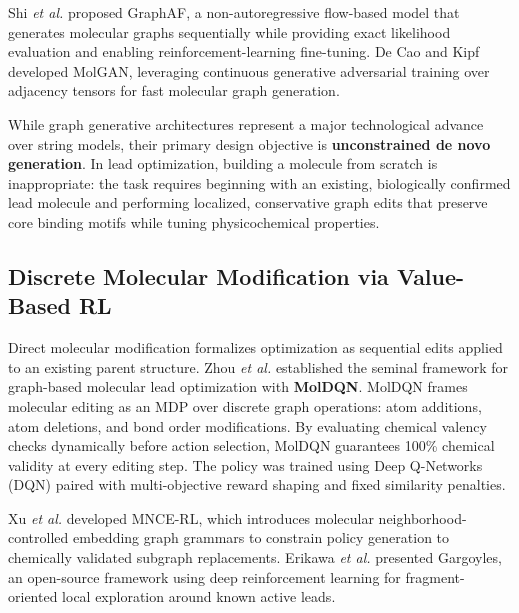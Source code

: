 \documentclass{ieeeaccess}
\begin{document}
Shi \emph{et al.} \cite{shi2020} proposed GraphAF, a non-autoregressive flow-based model that generates molecular graphs sequentially while providing exact likelihood evaluation and enabling reinforcement-learning fine-tuning. De Cao and Kipf \cite{decao2018} developed MolGAN, leveraging continuous generative adversarial training over adjacency tensors for fast molecular graph generation.

While graph generative architectures represent a major technological advance over string models, their primary design objective is \textbf{unconstrained de novo generation}. In lead optimization, building a molecule from scratch is inappropriate: the task requires beginning with an existing, biologically confirmed lead molecule and performing localized, conservative graph edits that preserve core binding motifs while tuning physicochemical properties.

\subsection{Discrete Molecular Modification via Value-Based RL}
Direct molecular modification formalizes optimization as sequential edits applied to an existing parent structure. Zhou \emph{et al.} \cite{zhou2019} established the seminal framework for graph-based molecular lead optimization with \textbf{MolDQN}. MolDQN frames molecular editing as an MDP over discrete graph operations: atom additions, atom deletions, and bond order modifications. By evaluating chemical valency checks dynamically before action selection, MolDQN guarantees 100\% chemical validity at every editing step. The policy was trained using Deep Q-Networks (DQN) paired with multi-objective reward shaping and fixed similarity penalties.

Xu \emph{et al.} \cite{xu2020} developed MNCE-RL, which introduces molecular neighborhood-controlled embedding graph grammars to constrain policy generation to chemically validated subgraph replacements. Erikawa \emph{et al.} \cite{erikawa2023} presented Gargoyles, an open-source framework using deep reinforcement learning for fragment-oriented local exploration around known active leads.
\end{document}
